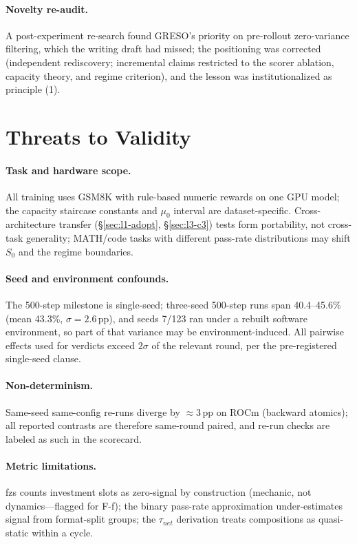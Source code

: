 \documentclass[11pt]{article}
\theoremstyle{definition}
\begin{document}
\paragraph{Novelty re-audit.} A post-experiment re-search found GRESO's priority
on pre-rollout zero-variance filtering, which the writing draft had missed; the
positioning was corrected (independent rediscovery; incremental claims restricted
to the scorer ablation, capacity theory, and regime criterion), and the lesson was
institutionalized as principle (1).

\section{Threats to Validity}\label{sec:threats}
\paragraph{Task and hardware scope.} All training uses GSM8K with rule-based
numeric rewards on one GPU model; the capacity staircase constants and $\mu_0$
interval are dataset-specific. Cross-architecture transfer (\S\ref{sec:l1-adopt},
\S\ref{sec:l3-c3}) tests form portability, not cross-task generality; MATH/code
tasks with different pass-rate distributions may shift $S_0$ and the regime
boundaries.
\paragraph{Seed and environment confounds.} The 500-step milestone is single-seed;
three-seed 500-step runs span 40.4--45.6\% (mean 43.3\%, $\sigma{=}2.6$\,pp), and
seeds 7/123 ran under a rebuilt software environment, so part of that variance may
be environment-induced. All pairwise effects used for verdicts exceed $2\sigma$ of
the relevant round, per the pre-registered single-seed clause.
\paragraph{Non-determinism.} Same-seed same-config re-runs diverge by
${\approx}3$\,pp on ROCm (backward atomics); all reported contrasts are therefore
same-round paired, and re-run checks are labeled as such in the scorecard.
\paragraph{Metric limitations.} fzs counts investment slots as zero-signal by
construction (mechanic, not dynamics---flagged for F-f); the binary pass-rate
approximation under-estimates signal from format-split groups; the $\tau_{net}$
derivation treats compositions as quasi-static within a cycle.
\end{document}
